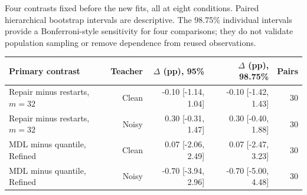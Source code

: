\begin{kbtable}
\centering
\caption{Four contrasts fixed before the new fits, all at eight conditions. Paired hierarchical bootstrap intervals are descriptive. The 98.75\% individual intervals provide a Bonferroni-style sensitivity for four comparisons; they do not validate population sampling or remove dependence from reused observations.}
\label{tab:checklist_primary}
\small
\begin{adjustbox}{max width=\linewidth}
\begin{tabular}{lrrrr}
\toprule
Primary contrast & Teacher & $\Delta$ (pp), 95\% & $\Delta$ (pp), 98.75\% & Pairs \\
\midrule
Repair minus restarts, $m=32$ & Clean & -0.10 [-1.14, 1.04] & -0.10 [-1.42, 1.43] & 30 \\
Repair minus restarts, $m=32$ & Noisy & 0.30 [-0.31, 1.47] & 0.30 [-0.40, 1.88] & 30 \\
MDL minus quantile, Refined & Clean & 0.07 [-2.06, 2.49] & 0.07 [-2.47, 3.23] & 30 \\
MDL minus quantile, Refined & Noisy & -0.70 [-3.94, 2.96] & -0.70 [-5.00, 4.48] & 30 \\
\bottomrule
\end{tabular}
\end{adjustbox}
\end{kbtable}
